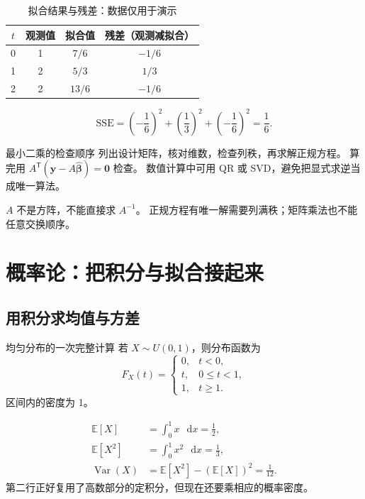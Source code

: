 \documentclass[UTF8,11pt,a4paper,oneside,openany,linespread=1]{ctexbook}
\newcommand{\dd}{\mathop{}\!\mathrm{d}}
\newcommand{\E}{\mathbb{E}}
\numberwithin{equation}{chapter}
\begin{document}
\begin{table}[htbp]
\centering
\caption{拟合结果与残差：数据仅用于演示}\label{tab:fit}
\begin{tabular}{cccc}
\toprule
\(t\) & 观测值 & 拟合值 & 残差（观测减拟合） \\
\midrule
0 & 1 & \(7/6\) & \(-1/6\) \\
1 & 2 & \(5/3\) & \(1/3\) \\
2 & 2 & \(13/6\) & \(-1/6\) \\
\bottomrule
\end{tabular}
\end{table}
\[
  \mathrm{SSE}=\left(-\frac16\right)^2+
    \left(\frac13\right)^2+\left(-\frac16\right)^2=\frac16.
\]
\begin{methodbox}{最小二乘的检查顺序}
列出设计矩阵，核对维数，检查列秩，再求解正规方程。
算完用 \(A^{\mathsf T}(\bm{y}-A\widehat{\bm{\beta}})=\bm0\) 检查。
数值计算中可用 QR 或 SVD，避免把显式求逆当成唯一算法。
\end{methodbox}
\begin{pitfallbox}
\(A\) 不是方阵，不能直接求 \(A^{-1}\)。
正规方程有唯一解需要列满秩；矩阵乘法也不能任意交换顺序。
\end{pitfallbox}

\section{概率论：把积分与拟合接起来}\label{ch:probability}
\subsection{用积分求均值与方差}
\begin{conceptbox}{均匀分布的一次完整计算}
若 \(X\sim U(0,1)\)，则分布函数为
\[
  F_X(t)=\begin{cases}
    0,&t<0,\\
    t,&0\leq t<1,\\
    1,&t\geq1.
  \end{cases}
\]
区间内的密度为 1。
\end{conceptbox}
\begin{align*}
  \E[X]&=\int_0^1x\,\dd x=\frac12,\\
  \E[X^2]&=\int_0^1x^2\,\dd x=\frac13,\\
  \operatorname{Var}(X)&=\E[X^2]-(\E[X])^2=\frac1{12}.
\end{align*}
第二行正好复用了高数部分的定积分，但现在还要乘相应的概率密度。
\end{document}
